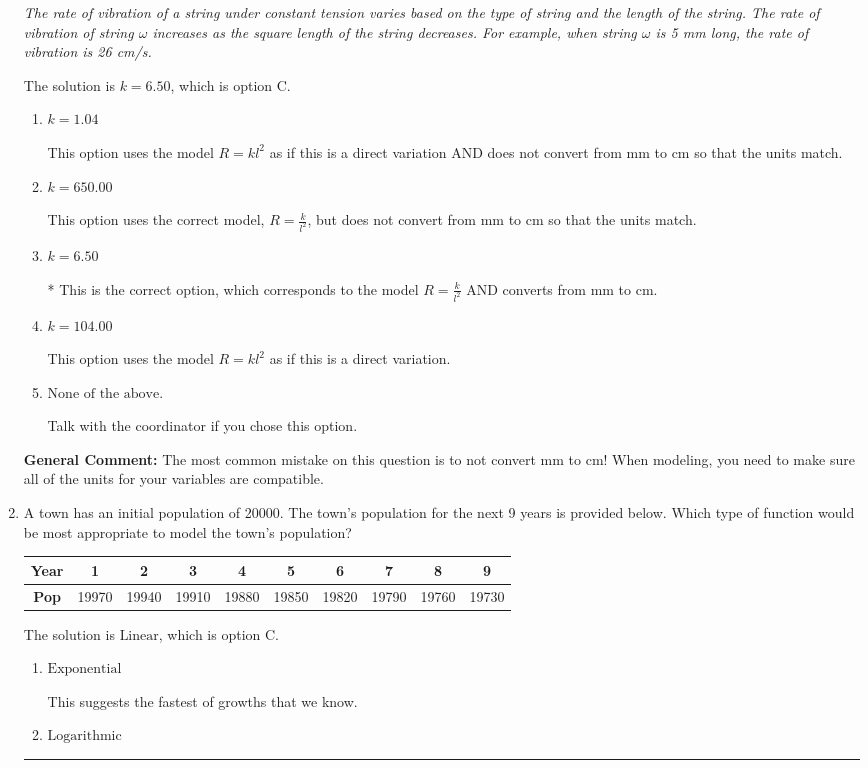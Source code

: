 \documentclass{extbook}[14pt]
\newcommand{\litem}[1]{\item #1

\rule{\textwidth}{0.4pt}}
\begin{document}
\begin{enumerate}
{\begin{center}
    \textit{ The rate of vibration of a string under constant tension varies based on the type of string and the length of the string. The rate of vibration of string $\omega$ increases as the square length of the string decreases. For example, when string $\omega$ is 5 mm long, the rate of vibration is 26 cm/s. }
\end{center}
The solution is \( k = 6.50 \), which is option C.\begin{enumerate}[label=\Alph*.]
\item \( k = 1.04 \)

This option uses the model $R = kl^{2}$ as if this is a direct variation AND does not convert from mm to cm so that the units match.
\item \( k = 650.00 \)

This option uses the correct model, $R = \frac{k}{l^{2}}$, but does not convert from mm to cm so that the units match.
\item \( k = 6.50 \)

* This is the correct option, which corresponds to the model $R = \frac{k}{l^{2}}$ AND converts from mm to cm.
\item \( k = 104.00 \)

This option uses the model $R = kl^{2}$ as if this is a direct variation.
\item \( \text{None of the above.} \)

Talk with the coordinator if you chose this option.
\end{enumerate}

\textbf{General Comment:} The most common mistake on this question is to not convert mm to cm! When modeling, you need to make sure all of the units for your variables are compatible.
}
\litem{
A town has an initial population of 20000. The town's population for the next 9 years is provided below. Which type of function would be most appropriate to model the town's population?


\begin{tabular}{c|c|c|c|c|c|c|c|c|c}
\textbf{Year} &1 &2 &3 &4 &5 &6 &7 &8 &9\tabularnewline \hline
\textbf{Pop} &19970 &19940 &19910 &19880 &19850 &19820 &19790 &19760 &19730\end{tabular}The solution is \( \text{Linear} \), which is option C.\begin{enumerate}[label=\Alph*.]
\item \( \text{Exponential} \)

This suggests the fastest of growths that we know.
\item \( \text{Logarithmic} \)


\end{enumerate}}
\end{enumerate}
\end{document}
